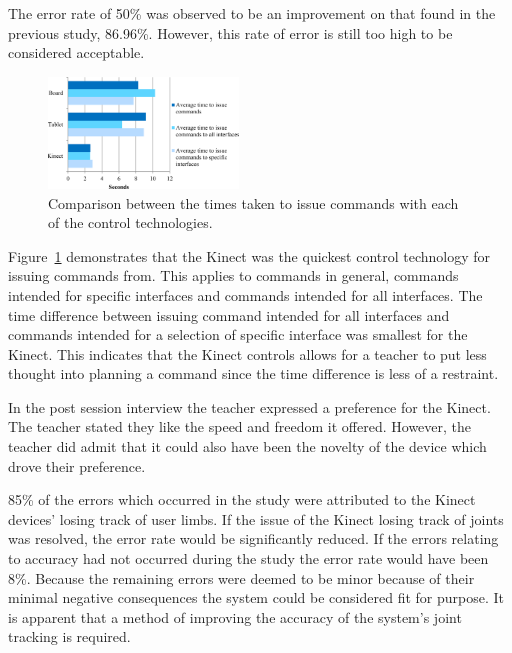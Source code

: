 \documentclass[manuscript, review, screen]{acmart}
\begin{document}
The error rate of 50\% was observed to be an improvement on that found in the previous study, 86.96\%.
However, this rate of error is still too high to be considered acceptable.

\begin{figure}[h]
  \centering
  \includegraphics[width=0.45\textwidth]{figures/bar_chart_times.png}
  \caption{Comparison between the times taken to issue commands with each of the control technologies.}
  \label{fig:controlDevicesTimes}
\end{figure}

Figure~\ref{fig:controlDevicesTimes} demonstrates that the Kinect was the quickest control technology for issuing commands from.
This applies to commands in general, commands intended for specific interfaces and commands intended for all interfaces.
The time difference between issuing command intended for all interfaces and commands intended for a selection of specific interface was smallest for the Kinect.
This indicates that the Kinect controls allows for a teacher to put less thought into planning a command since the time difference is less of a restraint.

In the post session interview the teacher expressed a preference for the Kinect.
The teacher stated they like the speed and freedom it offered.
However, the teacher did admit that it could also have been the novelty of the device which drove their preference.

85\% of the errors which occurred in the study were attributed to the Kinect devices' losing track of user limbs.
If the issue of the Kinect losing track of joints was resolved, the error rate would be significantly reduced.
If the errors relating to accuracy had not occurred during the study the error rate would have been 8\%.
Because the remaining errors were deemed to be minor because of their minimal negative consequences the system could be considered fit for purpose.
It is apparent that a method of improving the accuracy of the system's joint tracking is required.
\end{document}
